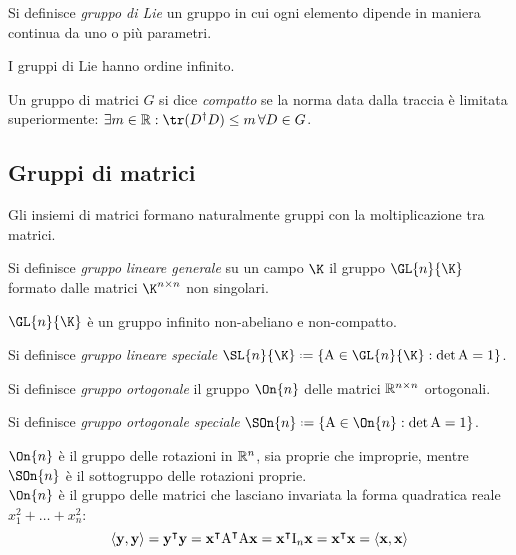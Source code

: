 \begin{definition}
	Si definisce \textit{gruppo di Lie} un gruppo in cui ogni elemento dipende in maniera continua da uno o più parametri.
\end{definition}
I gruppi di Lie hanno ordine infinito.

\begin{definition}
	Un gruppo di matrici $ G $ si dice \textit{compatto} se la norma data dalla traccia è limitata superiormente: $ \exists m \in \R : \tr ( D^{\dagger}D ) \le m \,\forall D \in G $.
\end{definition}

\subsection{Gruppi di matrici}

Gli insiemi di matrici formano naturalmente gruppi con la moltiplicazione tra matrici.

\begin{definition}
	Si definisce \textit{gruppo lineare generale} su un campo $ \K $ il gruppo $ \GL{n}{\K} $ formato dalle matrici $ \K^{n \times n} $ non singolari.
\end{definition}

\begin{proposition}
	$ \GL{n}{\K} $ è un gruppo infinito non-abeliano e non-compatto.
\end{proposition}

\begin{definition}
	Si definisce \textit{gruppo lineare speciale} $ \SL{n}{\K} \defeq \{ \tens{A} \in \GL{n}{\K} : \det \tens{A} = 1\} $.
\end{definition}

\begin{definition}
	Si definisce \textit{gruppo ortogonale} il gruppo $ \On{n} $ delle matrici $ \mathbb{R}^{n \times n} $ ortogonali.
\end{definition}

\begin{definition}
	Si definisce \textit{gruppo ortogonale speciale} $ \SOn{n} \defeq \{ \tens{A} \in \On{n} : \det \tens{A} = 1\} $.
\end{definition}

$ \On{n} $ è il gruppo delle rotazioni in $ \mathbb{R}^n $, sia proprie che improprie, mentre $ \SOn{n} $ è il sottogruppo delle rotazioni proprie.\\
$ \On{n} $ è il gruppo delle matrici che lasciano invariata la forma quadratica reale $ x_1^2 + \dots + x_n^2 $:
\begin{equation*}
	\braket{\mathbf{y} , \mathbf{y}} = \mathbf{y}^{\intercal} \mathbf{y} = \mathbf{x}^{\intercal} \mathbf{\text{A}}^{\intercal} \mathbf{\text{A}} \mathbf{x} = \mathbf{x}^{\intercal} \mathbf{\text{I}}_n \mathbf{x} = \mathbf{x}^{\intercal} \mathbf{x} = \braket{\mathbf{x} , \mathbf{x}}
\end{equation*}

